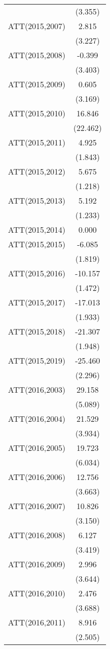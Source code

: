 \begin{table}
\begin{tabular}[t]{lc}
 & (3.355)\\
ATT(2015,2007) & 2.815\\
 & (3.227)\\
ATT(2015,2008) & -0.399\\
 & (3.403)\\
ATT(2015,2009) & 0.605\\
 & (3.169)\\
ATT(2015,2010) & 16.846\\
 & (22.462)\\
ATT(2015,2011) & 4.925\\
 & (1.843)\\
ATT(2015,2012) & 5.675\\
 & (1.218)\\
ATT(2015,2013) & 5.192\\
 & (1.233)\\
ATT(2015,2014) & 0.000\\
ATT(2015,2015) & -6.085\\
 & (1.819)\\
ATT(2015,2016) & -10.157\\
 & (1.472)\\
ATT(2015,2017) & -17.013\\
 & (1.933)\\
ATT(2015,2018) & -21.307\\
 & (1.948)\\
ATT(2015,2019) & -25.460\\
 & (2.296)\\
ATT(2016,2003) & 29.158\\
 & (5.089)\\
ATT(2016,2004) & 21.529\\
 & (3.934)\\
ATT(2016,2005) & 19.723\\
 & (6.034)\\
ATT(2016,2006) & 12.756\\
 & (3.663)\\
ATT(2016,2007) & 10.826\\
 & (3.150)\\
ATT(2016,2008) & 6.127\\
 & (3.419)\\
ATT(2016,2009) & 2.996\\
 & (3.644)\\
ATT(2016,2010) & 2.476\\
 & (3.688)\\
ATT(2016,2011) & 8.916\\
 & (2.505)\\

\end{tabular}
\end{table}
